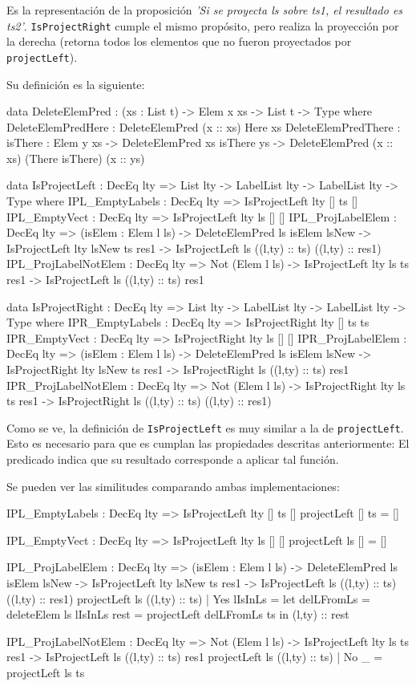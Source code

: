 Es la representación de la proposición \textit{'Si se proyecta ls sobre ts1, el resultado es ts2'}. \texttt{IsProjectRight} cumple el mismo propósito, pero realiza la proyección por la derecha (retorna todos los elementos que no fueron proyectados por \texttt{projectLeft}).

Su definición es la siguiente:

\begin{code}
data DeleteElemPred : (xs : List t) -> Elem x xs -> 
  List t -> Type where
  DeleteElemPredHere : DeleteElemPred (x :: xs) Here xs
  DeleteElemPredThere : {isThere : Elem y xs} -> 
    DeleteElemPred xs isThere ys -> 
    DeleteElemPred (x :: xs) (There isThere) (x :: ys)

data IsProjectLeft : DecEq lty => List lty -> LabelList lty -> 
  LabelList lty -> Type where
  IPL_EmptyLabels : DecEq lty => IsProjectLeft {lty} [] ts []
  IPL_EmptyVect : DecEq lty => IsProjectLeft {lty} ls [] []
  IPL_ProjLabelElem : DecEq lty => (isElem : Elem l ls) -> 
    DeleteElemPred ls isElem lsNew ->
    IsProjectLeft {lty} lsNew ts res1 -> 
    IsProjectLeft ls ((l,ty) :: ts) ((l,ty) :: res1)      
  IPL_ProjLabelNotElem : DecEq lty => Not (Elem l ls) -> 
    IsProjectLeft {lty} ls ts res1 -> 
    IsProjectLeft ls ((l,ty) :: ts) res1

data IsProjectRight : DecEq lty => List lty -> LabelList lty -> 
  LabelList lty -> Type where
  IPR_EmptyLabels : DecEq lty => IsProjectRight {lty} [] ts ts
  IPR_EmptyVect : DecEq lty => IsProjectRight {lty} ls [] []
  IPR_ProjLabelElem : DecEq lty => (isElem : Elem l ls) -> 
    DeleteElemPred ls isElem lsNew ->
    IsProjectRight {lty} lsNew ts res1 -> 
    IsProjectRight ls ((l,ty) :: ts) res1      
  IPR_ProjLabelNotElem : DecEq lty => Not (Elem l ls) -> 
    IsProjectRight {lty} ls ts res1 -> 
    IsProjectRight ls ((l,ty) :: ts) ((l,ty) :: res1)
\end{code}

Como se ve, la definición de \texttt{IsProjectLeft} es muy similar a la de \texttt{projectLeft}. Esto es necesario para que es cumplan las propiedades descritas anteriormente: El predicado indica que su resultado corresponde a aplicar tal función.

Se pueden ver las similitudes comparando ambas implementaciones:

\begin{code}
IPL_EmptyLabels : DecEq lty => IsProjectLeft {lty} [] ts []
projectLeft [] ts = []

IPL_EmptyVect : DecEq lty => IsProjectLeft {lty} ls [] []
projectLeft ls [] = []

IPL_ProjLabelElem : DecEq lty => (isElem : Elem l ls) -> 
    DeleteElemPred ls isElem lsNew ->
    IsProjectLeft {lty} lsNew ts res1 -> 
    IsProjectLeft ls ((l,ty) :: ts) ((l,ty) :: res1)   
projectLeft ls ((l,ty) :: ts) | Yes lIsInLs = 
    let delLFromLs = deleteElem ls lIsInLs
        rest = projectLeft delLFromLs ts
    in (l,ty) :: rest

IPL_ProjLabelNotElem : DecEq lty => Not (Elem l ls) -> 
    IsProjectLeft {lty} ls ts res1 -> 
    IsProjectLeft ls ((l,ty) :: ts) res1
projectLeft ls ((l,ty) :: ts) | No _ = projectLeft ls ts
\end{code}

